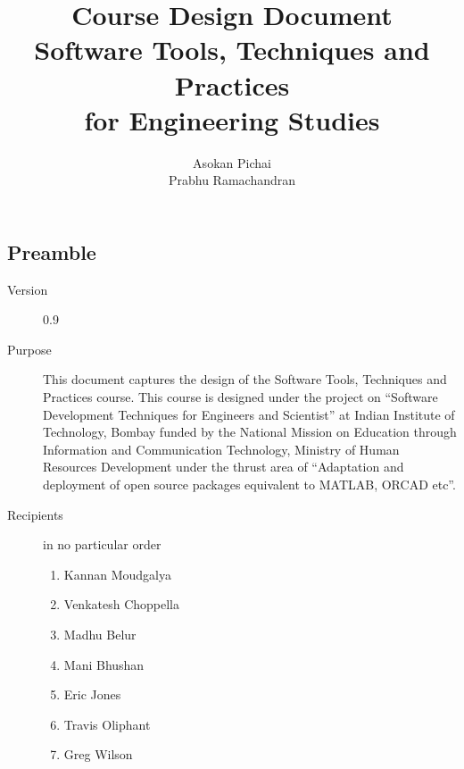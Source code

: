 \documentclass{article}
\title{Course Design Document\\Software Tools, Techniques and Practices\\for Engineering Studies}
\author{Asokan Pichai\\Prabhu Ramachandran}
\date{}
\begin{document}
\maketitle

\subsection{Preamble} 
\begin{description}
  \item[Version] 0.9
  \item[Purpose] This document captures the design of the Software
      Tools, Techniques and Practices course. This course is designed
      under the project on ``Software Development Techniques for Engineers and Scientist''
      at Indian Institute of Technology,
      Bombay funded by the National Mission on Education through
      Information and Communication Technology, Ministry of Human
      Resources Development under the thrust area of ``Adaptation and
      deployment of open source packages equivalent to MATLAB, ORCAD etc''.

  \item[Recipients] in no particular order
  \begin{enumerate}
     \item Kannan Moudgalya
     \item Venkatesh Choppella
     \item Madhu Belur
     \item Mani Bhushan
     \item Eric Jones
     \item Travis Oliphant
     \item Greg Wilson
  \end{enumerate}
\end{description}
\newpage
\end{document}
